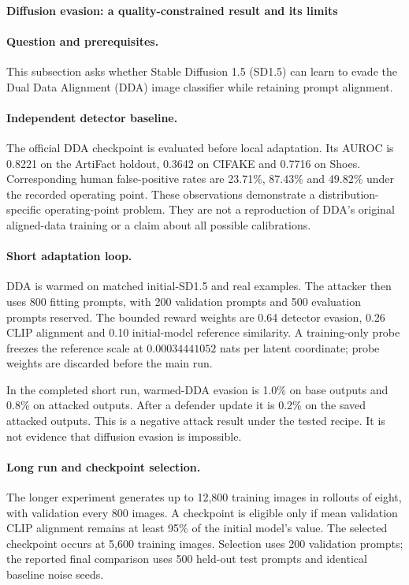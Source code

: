 \paragraph{Diffusion evasion: a quality-constrained result and its limits}
\label{sec:ddpo_results}
\paragraph{Question and prerequisites.} This subsection asks whether Stable Diffusion 1.5 (SD1.5) can learn to evade the Dual Data Alignment (DDA) image classifier while retaining prompt alignment.

\paragraph{Independent detector baseline.} The official DDA checkpoint is evaluated before local adaptation. Its AUROC is 0.8221 on the ArtiFact holdout, 0.3642 on CIFAKE and 0.7716 on Shoes. Corresponding human false-positive rates are 23.71\%, 87.43\% and 49.82\% under the recorded operating point. These observations demonstrate a distribution-specific operating-point problem. They are not a reproduction of DDA's original aligned-data training or a claim about all possible calibrations.

\paragraph{Short adaptation loop.} DDA is warmed on matched initial-SD1.5 and real examples. The attacker then uses 800 fitting prompts, with 200 validation prompts and 500 evaluation prompts reserved. The bounded reward weights are 0.64 detector evasion, 0.26 CLIP alignment and 0.10 initial-model reference similarity. A training-only probe freezes the reference scale at $0.00034441052$ nats per latent coordinate; probe weights are discarded before the main run.

In the completed short run, warmed-DDA evasion is 1.0\% on base outputs and 0.8\% on attacked outputs. After a defender update it is 0.2\% on the saved attacked outputs. This is a negative attack result under the tested recipe. It is not evidence that diffusion evasion is impossible.

\paragraph{Long run and checkpoint selection.} The longer experiment generates up to 12,800 training images in rollouts of eight, with validation every 800 images. A checkpoint is eligible only if mean validation CLIP alignment remains at least 95\% of the initial model's value. The selected checkpoint occurs at 5,600 training images. Selection uses 200 validation prompts; the reported final comparison uses 500 held-out test prompts and identical baseline noise seeds.

